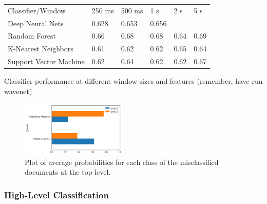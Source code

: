 \begin{table}[]
    \begin{tabular}{llllll}
    Classifier/Window       & 250 ms & 500 ms & 1 s   & 2 s  & 5 s   \\
    Deep Neural Nets        & 0.628  & 0.653  & 0.656 &      &       \\
    Random Forest           & 0.66   & 0.68   & 0.68  & 0.64 & 0.69  \\
    K-Nearest Neighbors     & 0.61   & 0.62   & 0.62  & 0.65 & 0.64 \\
    Support Vector Machine  & 0.62   & 0.64   & 0.62  & 0.62 & 0.67   
    \end{tabular}
\end{table}

Classifier performance at different window sizes and features (remember, have run wavenet)

\begin{figure}[h]
    \centering
    \includegraphics[width=0.45\textwidth]{figures/knn-prob-plot.png}
    \caption{Plot of average probabilities for each class of the misclassified documents at the top level.}
    \label{fig:a}
\end{figure}

\subsubsection{High-Level Classification}


